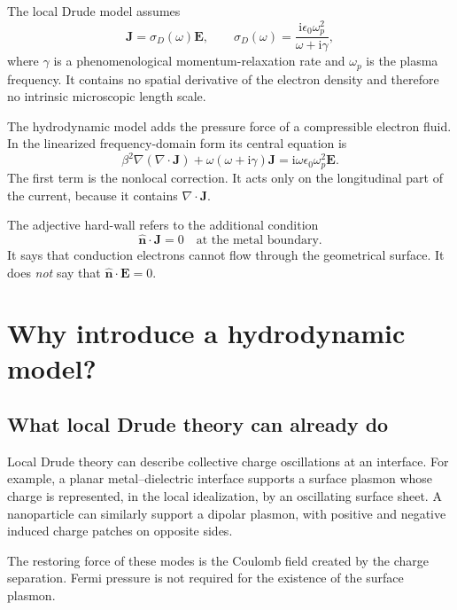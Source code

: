 \documentclass[11pt,a4paper]{article}
\newcommand{\E}{\mathbf E}
\newcommand{\J}{\mathbf J}
\newcommand{\nvec}{\hat{\mathbf n}}
\newcommand{\ii}{\mathrm i}
\newcommand{\omegap}{\omega_p}
\begin{document}
The local Drude model assumes
\begin{equation}
    \J=\sigma_D(\omega)\E,
    \qquad
    \sigma_D(\omega)=\frac{\ii\epsilon_0\omegap^2}{\omega+\ii\gamma},
    \label{eq:local-drude-current}
\end{equation}
where \(\gamma\) is a phenomenological momentum-relaxation rate and
\(\omegap\) is the plasma frequency.  It contains no spatial derivative of
the electron density and therefore no intrinsic microscopic length scale.

The hydrodynamic model adds the pressure force of a compressible electron
fluid.  In the linearized frequency-domain form its central equation is
\begin{equation}
    \boxed{
    \beta^2\nabla\!\left(\nabla\!\cdot\!\J\right)
    +\omega(\omega+\ii\gamma)\J
    =\ii\omega\epsilon_0\omegap^2\E.
    }
    \label{eq:hdm-current-central}
\end{equation}
The first term is the nonlocal correction.  It acts only on the
longitudinal part of the current, because it contains \(\nabla\!\cdot\!\J\).

The adjective hard-wall refers to the additional condition
\begin{equation}
    \boxed{\nvec\!\cdot\!\J=0\quad\text{at the metal boundary}.}
    \label{eq:hard-wall-central}
\end{equation}
It says that conduction electrons cannot flow through the geometrical
surface.  It does \emph{not} say that \(\nvec\!\cdot\!\E=0\).

\section{Why introduce a hydrodynamic model?}

\subsection{What local Drude theory can already do}

Local Drude theory can describe collective charge oscillations at an interface.
For example, a planar metal--dielectric interface supports a surface plasmon
whose charge is represented, in the local idealization, by an oscillating
surface sheet.  A nanoparticle can similarly support a dipolar plasmon, with
positive and negative induced charge patches on opposite sides.

The restoring force of these modes is the Coulomb field created by the charge
separation.  Fermi pressure is not required for the existence of the surface
plasmon.
\end{document}
